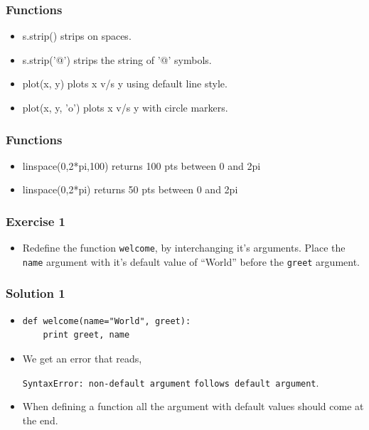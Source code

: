 \documentclass[17pt]{beamer}
\begin{document}
\begin{frame}[fragile]
\frametitle{Functions}
\label{sec-4.1}
\begin{itemize}
\lstset{language=Python}

\item s.strip() strips on spaces. 
\item s.strip('@') strips the string of '@' 
symbols.

\item plot(x, y) plots x v/s y using default 
line style. 
\item plot(x, y, 'o') plots x v/s y with 
circle markers. 
\end{itemize}
\end{frame}

\begin{frame}[fragile]
\frametitle{Functions}
\label{sec-4.2}
\begin{itemize}
\lstset{language=Python}
\item linspace(0,2*pi,100) returns 100 pts between 0 and 2pi

\item linspace(0,2*pi) returns 50 pts between 0 and 2pi
\end{itemize}
\end{frame}

\begin{frame}
\frametitle{Exercise 1}
\label{sec-5}

\begin{itemize}
\item Redefine the function \texttt{welcome}, by interchanging it's
  arguments.
\vspace{3pt}  
  Place the \texttt{name} argument with it's default value of
  ``World'' before the \texttt{greet} argument.
\end{itemize}
\end{frame}

\begin{frame}[fragile]
\frametitle{Solution 1}
\label{sec-6}
\begin{itemize}
\item 
\lstset{language=Python}
\begin{small}
\begin{lstlisting}
def welcome(name="World", greet):
    print greet, name
\end{lstlisting}
\end{small}\pause
\item  We get an error that reads, \\
  \begin{small}
  \verb~SyntaxError: non-default argument~
  \verb~follows default argument~.
  \end{small}\pause
\item When defining a function all the
  argument with default values should come at the end.

\end{itemize}
\end{frame}
\end{document}

